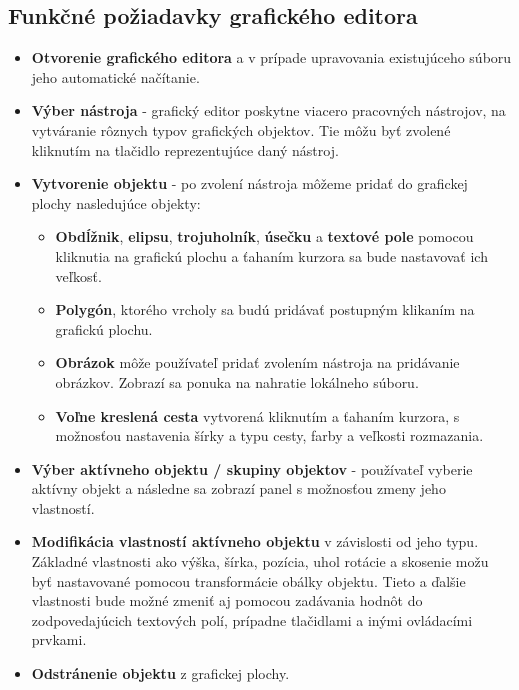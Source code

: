 \subsection{Funkčné požiadavky grafického editora}
\begin{itemize}
	\item \textbf{Otvorenie grafického editora} a v prípade upravovania existujúceho súboru jeho automatické načítanie.
	
	\item \textbf{Výber nástroja} - grafický editor poskytne viacero pracovných nástrojov, na vytváranie rôznych typov grafických objektov. Tie môžu byť zvolené kliknutím na tlačidlo reprezentujúce daný nástroj. 
	
	\item \textbf{Vytvorenie objektu} - po zvolení nástroja môžeme pridať do grafickej plochy nasledujúce objekty:
	\begin{itemize}
		\item \textbf{Obdĺžnik}, \textbf{elipsu}, \textbf{trojuholník}, \textbf{úsečku} a \textbf{textové pole} pomocou kliknutia na grafickú plochu a  ťahaním kurzora sa bude nastavovať ich veľkosť.
		\item \textbf{Polygón}, ktorého vrcholy sa budú pridávať postupným klikaním na grafickú plochu.
		\item \textbf{Obrázok} môže používateľ pridať zvolením nástroja na pridávanie obrázkov. Zobrazí sa ponuka na nahratie lokálneho súboru.
		\item \textbf{Voľne kreslená cesta} vytvorená kliknutím a ťahaním kurzora, s možnosťou nastavenia šírky a typu cesty, farby a veľkosti rozmazania.
	\end{itemize}
	
	\item \textbf{Výber aktívneho objektu / skupiny objektov} - používateľ vyberie aktívny objekt a následne sa zobrazí panel s možnosťou zmeny jeho vlastností.
	
	\item \textbf{Modifikácia vlastností aktívneho objektu} v závislosti od jeho typu. Základné vlastnosti ako výška, šírka, pozícia, uhol rotácie a skosenie možu byť nastavované pomocou transformácie obálky objektu. Tieto a ďalšie vlastnosti bude možné zmeniť aj pomocou zadávania hodnôt do zodpovedajúcich textových polí, prípadne tlačidlami a inými ovládacími prvkami.
	
	\item \textbf{Odstránenie objektu} z grafickej plochy. 
	

\end{itemize}
